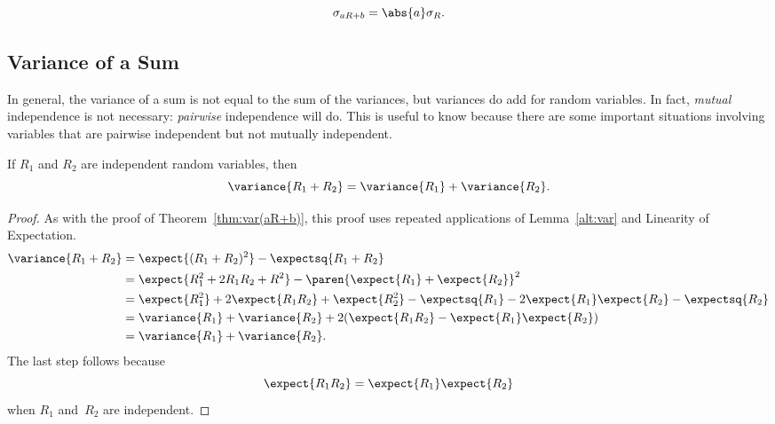 \begin{corollary}
\[
\sigma_{aR+b} = \abs{a}\sigma_{R}.
\]
\end{corollary}

\subsection{Variance of a Sum}

In general, the variance of a sum is not equal to the sum of the
variances, but variances do add for \emph{} random
variables.  In fact,  \emph{mutual}
independence is not necessary: 
\emph{pairwise} independence will do.  This is useful to know because
there are some important situations involving variables that are
pairwise independent but not mutually independent.

\begin{theorem}\label{indvar}
If $R_1$ and $R_2$ are independent random variables, then
\begin{equation}\label{vR+R}
\variance{R_1 + R_2} = \variance{R_1} + \variance{R_2}.
\end{equation}
\end{theorem}

\begin{proof}

As with the proof of Theorem~\ref{thm:var(aR+b)}, this proof uses
repeated applications of Lemma~\ref{alt:var} and Linearity of
Expectation.
\begin{align*}
\variance{R_1 + R_2}
    &= \expect{(R_1 + R_2)^2} - \expectsq{R_1 + R_2} \\
    &= \expect{R_1^2 + 2 R_1 R_2 + R^2}
            - \paren{\expect{R_1} + \expect{R_2}}^2 \\
    &= \expect{R_1^2} + 2 \expect{R_1 R_2} + \expect{R_2^2}
            - \expectsq{R_1} - 2 \expect{R_1} \expect{R_2}
            - \expectsq{R_2} \\
    &= \variance{R_1} + \variance{R_2}
            + 2( \expect{R_1 R_2} - \expect{R_1} \expect{R_2} ) \\
    &= \variance{R_1} + \variance{R_2}.
\end{align*}
The last step follows because
\begin{equation*}
    \expect{R_1 R_2} = \expect{R_1} \expect{R_2}
\end{equation*}
when $R_1$ and~$R_2$ are independent.
\end{proof}

